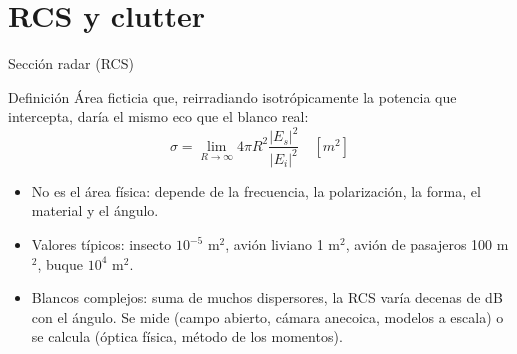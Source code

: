 \section[RCS y clutter]{RCS y clutter}
\begin{frame}{Sección radar (RCS)}
  \begin{block}{Definición}
    Área ficticia que, reirradiando isotrópicamente la potencia que intercepta, daría el mismo eco que el blanco real:
    \[ \sigma = \lim_{R\to\infty} 4\pi R^2 \frac{|E_s|^2}{|E_i|^2} \quad [m^2] \]
  \end{block}
  \small
  \begin{itemize}
    \item No es el área física: depende de la frecuencia, la polarización, la forma, el material y el ángulo.
    \item Valores típicos: insecto $10^{-5}$ m$^2$, avión liviano 1 m$^2$, avión de pasajeros 100 m$^2$, buque $10^4$ m$^2$.
    \item Blancos complejos: suma de muchos dispersores, la RCS varía decenas de dB con el ángulo. Se mide (campo abierto, cámara anecoica, modelos a escala) o se calcula (óptica física, método de los momentos).
  \end{itemize}
\end{frame}

